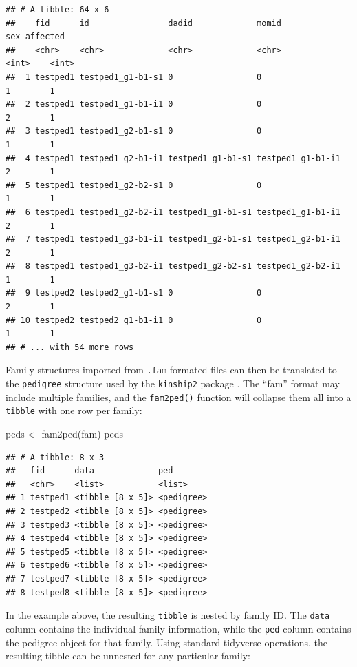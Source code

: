 \documentclass[9pt,a4paper,]{extarticle}
\newenvironment{Shaded}{\begin{snugshade}}{\end{snugshade}}
\newcommand{\FunctionTok}[1]{\textcolor[rgb]{0.00,0.00,0.00}{#1}}
\newcommand{\NormalTok}[1]{#1}
\newcommand{\OtherTok}[1]{\textcolor[rgb]{0.56,0.35,0.01}{#1}}
\begin{document}
\begin{verbatim}
## # A tibble: 64 x 6
##    fid      id                dadid             momid               sex affected
##    <chr>    <chr>             <chr>             <chr>             <int>    <int>
##  1 testped1 testped1_g1-b1-s1 0                 0                     1        1
##  2 testped1 testped1_g1-b1-i1 0                 0                     2        1
##  3 testped1 testped1_g2-b1-s1 0                 0                     1        1
##  4 testped1 testped1_g2-b1-i1 testped1_g1-b1-s1 testped1_g1-b1-i1     2        1
##  5 testped1 testped1_g2-b2-s1 0                 0                     1        1
##  6 testped1 testped1_g2-b2-i1 testped1_g1-b1-s1 testped1_g1-b1-i1     2        1
##  7 testped1 testped1_g3-b1-i1 testped1_g2-b1-s1 testped1_g2-b1-i1     2        1
##  8 testped1 testped1_g3-b2-i1 testped1_g2-b2-s1 testped1_g2-b2-i1     1        1
##  9 testped2 testped2_g1-b1-s1 0                 0                     2        1
## 10 testped2 testped2_g1-b1-i1 0                 0                     1        1
## # ... with 54 more rows
\end{verbatim}

Family structures imported from \texttt{.fam} formated files can then be translated to the \texttt{pedigree} structure used by the \texttt{kinship2} package \citep{sinnwell2014}. The ``fam'' format may include multiple families, and the \texttt{fam2ped()} function will collapse them all into a \texttt{tibble} with one row per family:

\begin{Shaded}
\begin{Highlighting}[]
\NormalTok{peds }\OtherTok{\textless{}{-}} \FunctionTok{fam2ped}\NormalTok{(fam)}
\NormalTok{peds}
\end{Highlighting}
\end{Shaded}

\begin{verbatim}
## # A tibble: 8 x 3
##   fid      data             ped       
##   <chr>    <list>           <list>    
## 1 testped1 <tibble [8 x 5]> <pedigree>
## 2 testped2 <tibble [8 x 5]> <pedigree>
## 3 testped3 <tibble [8 x 5]> <pedigree>
## 4 testped4 <tibble [8 x 5]> <pedigree>
## 5 testped5 <tibble [8 x 5]> <pedigree>
## 6 testped6 <tibble [8 x 5]> <pedigree>
## 7 testped7 <tibble [8 x 5]> <pedigree>
## 8 testped8 <tibble [8 x 5]> <pedigree>
\end{verbatim}

In the example above, the resulting \texttt{tibble} is nested by family ID. The \texttt{data} column contains the individual family information, while the \texttt{ped} column contains the pedigree object for that family. Using standard tidyverse operations, the resulting tibble can be unnested for any particular family:
\end{document}
